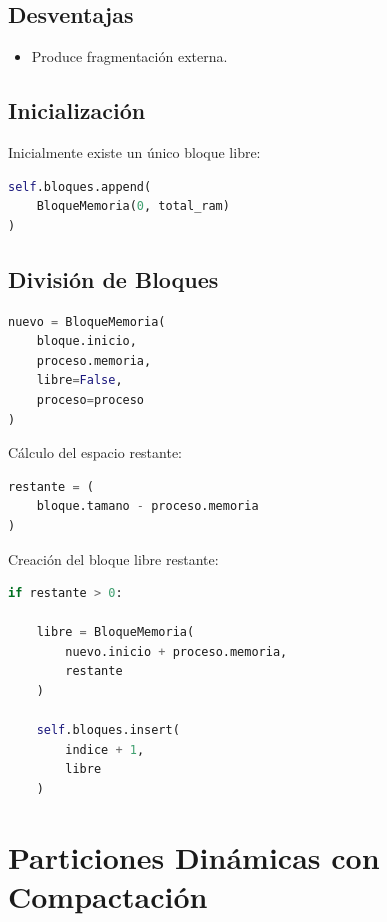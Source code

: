 \subsection{Desventajas}

\begin{itemize}
    \item Produce fragmentación externa.
\end{itemize}

\subsection{Inicialización}

Inicialmente existe un único bloque libre:

\begin{lstlisting}[language=Python]
self.bloques.append(
    BloqueMemoria(0, total_ram)
)
\end{lstlisting}

\subsection{División de Bloques}

\begin{lstlisting}[language=Python]
nuevo = BloqueMemoria(
    bloque.inicio,
    proceso.memoria,
    libre=False,
    proceso=proceso
)
\end{lstlisting}

Cálculo del espacio restante:

\begin{lstlisting}[language=Python]
restante = (
    bloque.tamano - proceso.memoria
)
\end{lstlisting}

Creación del bloque libre restante:

\begin{lstlisting}[language=Python]
if restante > 0:

    libre = BloqueMemoria(
        nuevo.inicio + proceso.memoria,
        restante
    )

    self.bloques.insert(
        indice + 1,
        libre
    )
\end{lstlisting}


\section{Particiones Dinámicas con Compactación}

